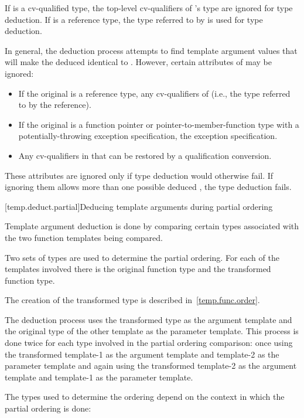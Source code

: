 \pnum
If
is a cv-qualified type, the top-level cv-qualifiers of
's
type are ignored for type deduction.
If
is a
reference type, the type referred to by
is used for type deduction.

\pnum
In general, the deduction process attempts to find template argument
values that will make the deduced
identical to
.
However, certain attributes of  may be ignored:

\begin{itemize}
\item
If the original  is a reference type,
any cv-qualifiers of 
(i.e., the type referred to by the reference).
\item
If the original  is
a function pointer or pointer-to-member-function type
with a potentially-throwing exception specification,
the exception specification.
\item
Any cv-qualifiers in 
that can be restored by a qualification conversion.
\end{itemize}
These attributes are ignored only if type deduction would
otherwise fail.
If ignoring them allows more than one possible deduced
,
the type deduction fails.

[temp.deduct.partial]{Deducing template arguments during partial ordering}

\pnum
Template argument deduction is done by comparing certain types associated with
the two function templates being compared.

\pnum
Two sets of types are used to determine the partial ordering.  For each of
the templates involved there is the original function type and the
transformed function type.
\begin{note}
The creation of the transformed type is described in~\ref{temp.func.order}.
\end{note}
The deduction process uses the
transformed type as the argument template and the original type of the
other template as the parameter template.  This process is done twice
for each type involved in the partial ordering comparison: once using
the transformed template-1 as the argument template and template-2 as
the parameter template and again using the transformed template-2 as
the argument template and template-1 as the parameter template.

\pnum
The types used to determine the ordering depend on the context in which
the partial ordering is done:

